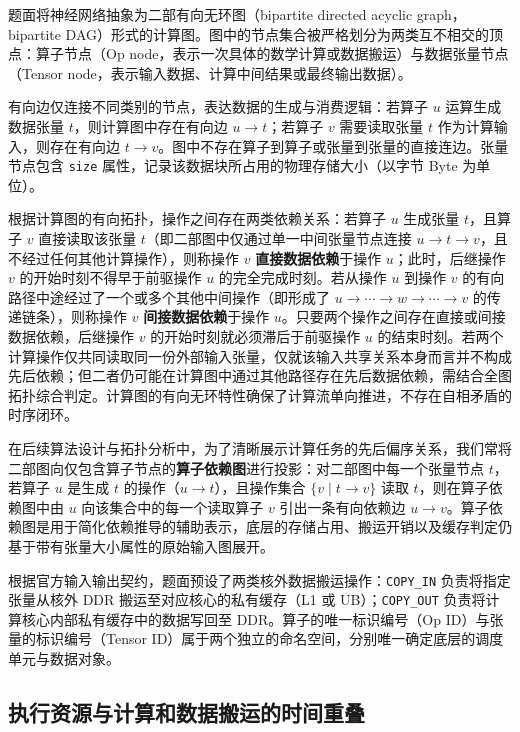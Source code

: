 \documentclass[anonymous,notoc]{gmcm2026}
\begin{document}
题面将神经网络抽象为二部有向无环图（bipartite directed acyclic graph，bipartite DAG）形式的计算图。图中的节点集合被严格划分为两类互不相交的顶点：算子节点（Op node，表示一次具体的数学计算或数据搬运）与数据张量节点（Tensor node，表示输入数据、计算中间结果或最终输出数据）。

有向边仅连接不同类别的节点，表达数据的生成与消费逻辑：若算子 \(u\) 运算生成数据张量 \(t\)，则计算图中存在有向边 \(u \to t\)；若算子 \(v\) 需要读取张量 \(t\) 作为计算输入，则存在有向边 \(t \to v\)。图中不存在算子到算子或张量到张量的直接连边。张量节点包含 \texttt{size} 属性，记录该数据块所占用的物理存储大小（以字节 Byte 为单位）。

根据计算图的有向拓扑，操作之间存在两类依赖关系：若算子 \(u\) 生成张量 \(t\)，且算子 \(v\) 直接读取该张量 \(t\)（即二部图中仅通过单一中间张量节点连接 \(u \to t \to v\)，且不经过任何其他计算操作），则称操作 \(v\) \textbf{直接数据依赖}于操作 \(u\)；此时，后继操作 \(v\) 的开始时刻不得早于前驱操作 \(u\) 的完全完成时刻。若从操作 \(u\) 到操作 \(v\) 的有向路径中途经过了一个或多个其他中间操作（即形成了 \(u \to \cdots \to w \to \cdots \to v\) 的传递链条），则称操作 \(v\) \textbf{间接数据依赖}于操作 \(u\)。只要两个操作之间存在直接或间接数据依赖，后继操作 \(v\) 的开始时刻就必须滞后于前驱操作 \(u\) 的结束时刻。若两个计算操作仅共同读取同一份外部输入张量，仅就该输入共享关系本身而言并不构成先后依赖；但二者仍可能在计算图中通过其他路径存在先后数据依赖，需结合全图拓扑综合判定。计算图的有向无环特性确保了计算流单向推进，不存在自相矛盾的时序闭环。

在后续算法设计与拓扑分析中，为了清晰展示计算任务的先后偏序关系，我们常将二部图向仅包含算子节点的\textbf{算子依赖图}进行投影：对二部图中每一个张量节点 \(t\)，若算子 \(u\) 是生成 \(t\) 的操作（\(u \to t\)），且操作集合 \(\{v \mid t \to v\}\) 读取 \(t\)，则在算子依赖图中由 \(u\) 向该集合中的每一个读取算子 \(v\) 引出一条有向依赖边 \(u \to v\)。算子依赖图是用于简化依赖推导的辅助表示，底层的存储占用、搬运开销以及缓存判定仍基于带有张量大小属性的原始输入图展开。

根据官方输入输出契约，题面预设了两类核外数据搬运操作：\texttt{COPY\_IN} 负责将指定张量从核外 DDR 搬运至对应核心的私有缓存（L1 或 UB）；\texttt{COPY\_OUT} 负责将计算核心内部私有缓存中的数据写回至 DDR。算子的唯一标识编号（Op ID）与张量的标识编号（Tensor ID）属于两个独立的命名空间，分别唯一确定底层的调度单元与数据对象。

\subsection{执行资源与计算和数据搬运的时间重叠}
\end{document}
